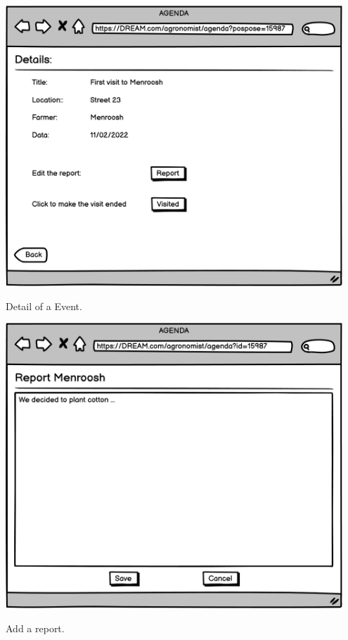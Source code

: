 \begin{minipage}{.5\textwidth}
	\centering
	\includegraphics[width=0.95\textwidth]{Images/Mockup/Agronomist/07AgronomistAgendaDetails.png}
	\captionsetup{type=figure}
	\caption{Detail of a Event.}
\end{minipage}%
\begin{minipage}{.5\textwidth}
	\centering
	\includegraphics[width=0.95\textwidth]{Images/Mockup/Agronomist/08AgronomistAgendaReport.png}
	\captionsetup{type=figure}
	\caption{Add a report.}
\end{minipage}
\vspace{0.5cm}
